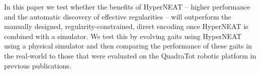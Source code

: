In this paper we test whether the benefits of HyperNEAT -- higher performance and the automatic discovery of effective regularities \cite{clune2} -- will outperform the manually designed, regularity-constrained, direct encoding once HyperNEAT is combined with a simulator. 
We test this by evolving gaits using HyperNEAT using a physical simulator and then comparing the performance of these gaits in the real-world to those that were evaluated on the QuadraTot robotic platform in previous publications.  


